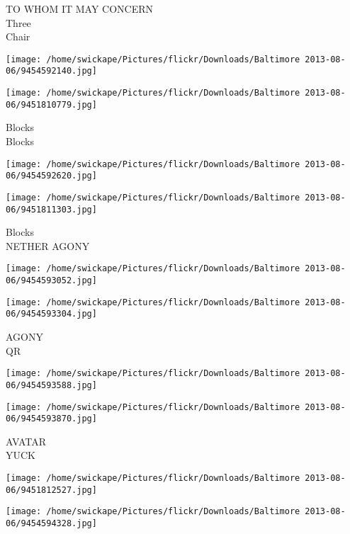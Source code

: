 \documentclass[10pt,letterpaper]{article}
\begin{document}
TO WHOM IT MAY CONCERN\\
Three\\
Chair\\
\pagebreak

\texttt{[image: /home/swickape/Pictures/flickr/Downloads/Baltimore 2013-08-06/9454592140.jpg]}

\vspace{0.25in}
\texttt{[image: /home/swickape/Pictures/flickr/Downloads/Baltimore 2013-08-06/9451810779.jpg]}

Blocks\\
Blocks\\
\pagebreak

\texttt{[image: /home/swickape/Pictures/flickr/Downloads/Baltimore 2013-08-06/9454592620.jpg]}

\vspace{0.25in}
\texttt{[image: /home/swickape/Pictures/flickr/Downloads/Baltimore 2013-08-06/9451811303.jpg]}

Blocks\\
NETHER AGONY\\
\pagebreak

\texttt{[image: /home/swickape/Pictures/flickr/Downloads/Baltimore 2013-08-06/9454593052.jpg]}

\vspace{0.25in}
\texttt{[image: /home/swickape/Pictures/flickr/Downloads/Baltimore 2013-08-06/9454593304.jpg]}

AGONY\\
QR\\
\pagebreak

\texttt{[image: /home/swickape/Pictures/flickr/Downloads/Baltimore 2013-08-06/9454593588.jpg]}

\vspace{0.25in}
\texttt{[image: /home/swickape/Pictures/flickr/Downloads/Baltimore 2013-08-06/9454593870.jpg]}

AVATAR\\
YUCK\\
\pagebreak

\texttt{[image: /home/swickape/Pictures/flickr/Downloads/Baltimore 2013-08-06/9451812527.jpg]}

\vspace{0.25in}
\texttt{[image: /home/swickape/Pictures/flickr/Downloads/Baltimore 2013-08-06/9454594328.jpg]}
\end{document}

